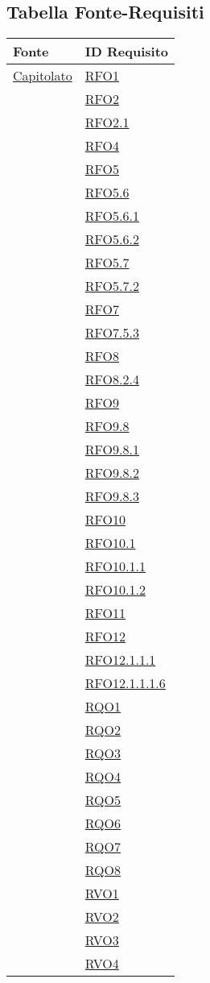 \newpage
\subsection{Tabella Fonte-Requisiti}
\normalsize
\begin{longtable}{|>{\centering}m{5cm}|m{5cm}<{\centering}|}
\hline 
\textbf{Fonte} & \textbf{ID Requisito}\\
\hline
\endhead
\hyperlink{Capitolato}{Capitolato}
& \hyperlink{RFO1}{RFO1}\\
& \hyperlink{RFO2}{RFO2}\\
& \hyperlink{RFO2.1}{RFO2.1}\\
& \hyperlink{RFO4}{RFO4}\\
& \hyperlink{RFO5}{RFO5}\\
& \hyperlink{RFO5.6}{RFO5.6}\\
& \hyperlink{RFO5.6.1}{RFO5.6.1}\\
& \hyperlink{RFO5.6.2}{RFO5.6.2}\\
& \hyperlink{RFO5.7}{RFO5.7}\\
& \hyperlink{RFO5.7.2}{RFO5.7.2}\\
& \hyperlink{RFO7}{RFO7}\\
& \hyperlink{RFO7.5.3}{RFO7.5.3}\\
& \hyperlink{RFO8}{RFO8}\\
& \hyperlink{RFO8.2.4}{RFO8.2.4}\\
& \hyperlink{RFO9}{RFO9}\\
& \hyperlink{RFO9.8}{RFO9.8}\\
& \hyperlink{RFO9.8.1}{RFO9.8.1}\\
& \hyperlink{RFO9.8.2}{RFO9.8.2}\\
& \hyperlink{RFO9.8.3}{RFO9.8.3}\\
& \hyperlink{RFO10}{RFO10}\\
& \hyperlink{RFO10.1}{RFO10.1}\\
& \hyperlink{RFO10.1.1}{RFO10.1.1}\\
& \hyperlink{RFO10.1.2}{RFO10.1.2}\\
& \hyperlink{RFO11}{RFO11}\\
& \hyperlink{RFO12}{RFO12}\\
& \hyperlink{RFO12.1.1.1}{RFO12.1.1.1}\\
& \hyperlink{RFO12.1.1.1.6}{RFO12.1.1.1.6}\\
& \hyperlink{RQO1}{RQO1}\\
& \hyperlink{RQO2}{RQO2}\\
& \hyperlink{RQO3}{RQO3}\\
& \hyperlink{RQO4}{RQO4}\\
& \hyperlink{RQO5}{RQO5}\\
& \hyperlink{RQO6}{RQO6}\\
& \hyperlink{RQO7}{RQO7}\\
& \hyperlink{RQO8}{RQO8}\\
& \hyperlink{RVO1}{RVO1}\\
& \hyperlink{RVO2}{RVO2}\\
& \hyperlink{RVO3}{RVO3}\\
& \hyperlink{RVO4}{RVO4}\\


\end{longtable}
